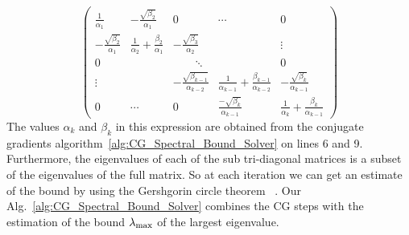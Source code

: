\begin{equation}\label{eq:tridiag}
    \left(
    \begin{array}{ccccc}
      \frac{1}{\alpha_1} & - \frac{\sqrt{\beta_2}}{\alpha_1}  & 0 & \cdots & 0 \\
      - \frac{\sqrt{\beta_2}}{\alpha_1} & \frac{1}{\alpha_2} + \frac{\beta_2}{\alpha_1} & - \frac{\sqrt{\beta_3}}{\alpha_2} & & \vdots \\
0 &  & \quad\quad\ddots &  & 0 \\
      \vdots &  &-\frac{\sqrt{\beta_{k-1}}}{\alpha_{k-2}} & \frac{1}{\alpha_{k-1}} + \frac{\beta_{k-1}}{\alpha_{k-2}}  & -\frac{\sqrt{\beta_k}}{\alpha_{k-1}} \\
               0 & \cdots & 0 &\frac{-\sqrt{\beta_k}}{\alpha_{k-1}} &  \frac{1}{\alpha_k} + \frac{\beta_k}{\alpha_{k-1}}
    \end{array}
    \right)
\end{equation}
The values $\alpha_k$ and $\beta_k$ in this expression are obtained
  from the conjugate gradients algorithm~\ref{alg:CG_Spectral_Bound_Solver} on lines 6 and 9. Furthermore,
the eigenvalues of each of the sub tri-diagonal matrices is a subset
of the eigenvalues of the full matrix. So at each iteration we can get
an estimate of the bound by using the Gershgorin circle theorem ~\cite{bell1965gershgorin}. Our Alg.~\ref{alg:CG_Spectral_Bound_Solver} combines the CG steps with the estimation of the bound $\lambda_{\rm max}$ of the largest eigenvalue.




